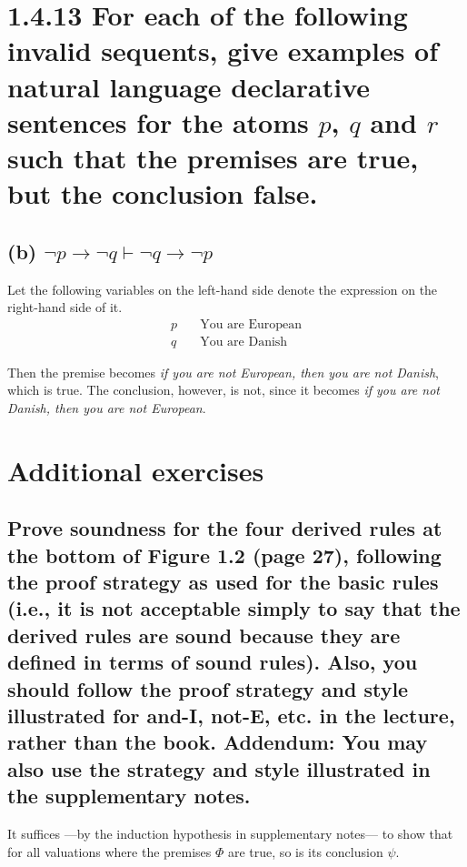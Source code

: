 \documentclass[11pt,a4paper]{article}
\let\imp\to
\begin{document}
\section*{1.4.13 \mdseries For each of the following invalid sequents, give examples of natural language declarative sentences for the atoms $p$, $q$ and $r$ such that the premises are true, but the conclusion false.}

\subsection*{(b) \mdseries $\neg p \imp \neg q \vdash \neg q \imp \neg p$}

Let the following variables on the left-hand side denote the expression on the right-hand side of it.
\begin{align*}
	p \quad &\text{You are European} \\
	q \quad &\text{You are Danish}
\end{align*}

Then the premise becomes {\it if you are not European, then you are not Danish}, which is true. The conclusion, however, is not, since it becomes {\it if you are not Danish, then you are not European}.

\section*{Additional exercises}

\subsection*{Prove soundness for the four derived rules at the bottom of Figure 1.2 (page 27),  following the proof strategy as used for the basic rules  (i.e., it is not acceptable simply to say that the derived rules are sound because they are defined in terms of sound rules). Also, you should follow the proof strategy and style illustrated for and-I, not-E, etc. in the lecture, rather than the book. Addendum: You may also use the strategy and style illustrated in the supplementary notes.}
It suffices ---by the induction hypothesis in supplementary notes--- to show that for all valuations where the premises $\Phi$ are true, so is its conclusion $\psi$.
\end{document}
